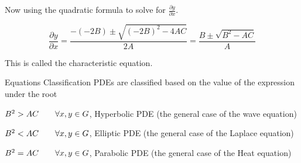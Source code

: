 Now using the quadratic formula to solve for $\displaystyle \frac{\partial y}{\partial x}$.

\[
    \frac{\partial y}{\partial x} = \frac{-\left(-2B\right)\pm\sqrt{{(-2B)}^2 -4AC}}{2A} = \frac{B\pm\sqrt{B^2 -AC}}{A}    
\]

This is called the characteristic equation.

\begin{enrichment*}{Equations Classification}
PDEs are classified based on the value of the expression under the root

$B^2 > AC \quad\quad \forall x,y\in G$, Hyperbolic PDE (the general case of the wave equation) 

$B^2 < AC \quad\quad \forall x,y\in G$, Elliptic PDE (the general case of the Laplace equation) 

$B^2 = AC \quad\quad \forall x,y\in G$, Parabolic PDE (the general case of the Heat equation) 
\end{enrichment*}
